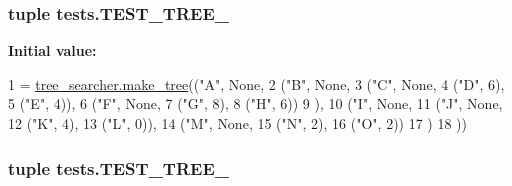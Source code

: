 \subsubsection[{T\+E\+S\+T\+\_\+\+T\+R\+E\+E\+\_\+2}]{\setlength{\rightskip}{0pt plus 5cm}tuple tests.\+T\+E\+S\+T\+\_\+\+T\+R\+E\+E\+\_}\label{namespacetests_ac8a5147066692f8370714f2b2bf0593f}
{\bfseries Initial value\+:}
\begin{DoxyCode}
1 = \hyperlink{namespacetree__searcher_ad7aa3b2a8e8a2967ca966399c95c9401}{tree\_searcher.make\_tree}((\textcolor{stringliteral}{"A"}, \textcolor{keywordtype}{None},
2                                        (\textcolor{stringliteral}{"B"}, \textcolor{keywordtype}{None},
3                                         (\textcolor{stringliteral}{"C"}, \textcolor{keywordtype}{None},
4                                          (\textcolor{stringliteral}{"D"}, 6),
5                                          (\textcolor{stringliteral}{"E"}, 4)),
6                                         (\textcolor{stringliteral}{"F"}, \textcolor{keywordtype}{None},
7                                          (\textcolor{stringliteral}{"G"}, 8),
8                                          (\textcolor{stringliteral}{"H"}, 6))
9                                         ),
10                                        (\textcolor{stringliteral}{"I"}, \textcolor{keywordtype}{None},
11                                         (\textcolor{stringliteral}{"J"}, \textcolor{keywordtype}{None},
12                                          (\textcolor{stringliteral}{"K"}, 4),
13                                          (\textcolor{stringliteral}{"L"}, 0)),
14                                         (\textcolor{stringliteral}{"M"}, \textcolor{keywordtype}{None},
15                                          (\textcolor{stringliteral}{"N"}, 2),
16                                          (\textcolor{stringliteral}{"O"}, 2))
17                                         )
18                                        ))
\end{DoxyCode}
\hypertarget{namespacetests_ac06c4b9bdd7838d7789c327dac2157f9}{}
\subsubsection[{T\+E\+S\+T\+\_\+\+T\+R\+E\+E\+\_\+3}]{\setlength{\rightskip}{0pt plus 5cm}tuple tests.\+T\+E\+S\+T\+\_\+\+T\+R\+E\+E\+\_}\label{namespacetests_ac06c4b9bdd7838d7789c327dac2157f9}
\hypertarget{namespacetests_a22d7b2dd14bb95e8f85cfb851ddad3df}{}
